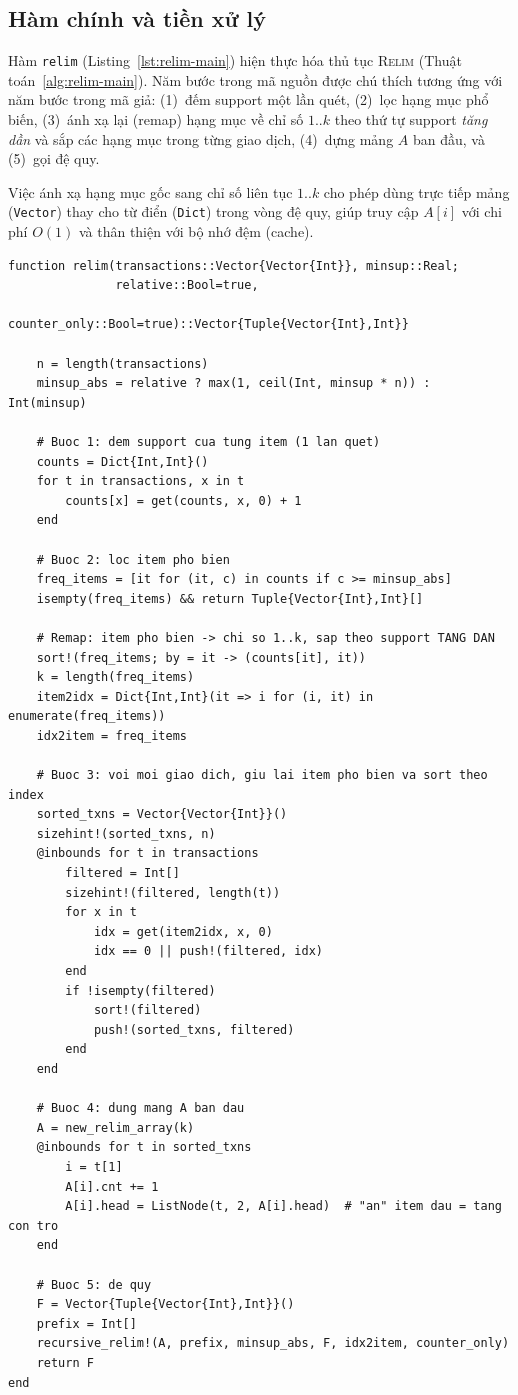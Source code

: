 \documentclass[12pt,a4paper]{report}
\begin{document}
\subsection{Hàm chính và tiền xử lý}

Hàm \texttt{relim} (Listing~\ref{lst:relim-main}) hiện thực hóa thủ tục
\textsc{Relim} (Thuật toán~\ref{alg:relim-main}). Năm bước trong mã nguồn được
chú thích tương ứng với năm bước trong mã giả: (1)~đếm support một lần quét,
(2)~lọc hạng mục phổ biến, (3)~ánh xạ lại (remap) hạng mục về chỉ số $1..k$ theo
thứ tự support \emph{tăng dần} và sắp các hạng mục trong từng giao dịch,
(4)~dựng mảng $A$ ban đầu, và (5)~gọi đệ quy.

Việc ánh xạ hạng mục gốc sang chỉ số liên tục $1..k$ cho phép dùng trực tiếp
mảng (\texttt{Vector}) thay cho từ điển (\texttt{Dict}) trong vòng đệ quy, giúp
truy cập $A[i]$ với chi phí $O(1)$ và thân thiện với bộ nhớ đệm (cache).

\begin{lstlisting}[style=julia, caption={Hàm chính \texttt{relim} (relim.jl)},
                   label={lst:relim-main}]
function relim(transactions::Vector{Vector{Int}}, minsup::Real;
               relative::Bool=true,
               counter_only::Bool=true)::Vector{Tuple{Vector{Int},Int}}

    n = length(transactions)
    minsup_abs = relative ? max(1, ceil(Int, minsup * n)) : Int(minsup)

    # Buoc 1: dem support cua tung item (1 lan quet)
    counts = Dict{Int,Int}()
    for t in transactions, x in t
        counts[x] = get(counts, x, 0) + 1
    end

    # Buoc 2: loc item pho bien
    freq_items = [it for (it, c) in counts if c >= minsup_abs]
    isempty(freq_items) && return Tuple{Vector{Int},Int}[]

    # Remap: item pho bien -> chi so 1..k, sap theo support TANG DAN
    sort!(freq_items; by = it -> (counts[it], it))
    k = length(freq_items)
    item2idx = Dict{Int,Int}(it => i for (i, it) in enumerate(freq_items))
    idx2item = freq_items

    # Buoc 3: voi moi giao dich, giu lai item pho bien va sort theo index
    sorted_txns = Vector{Vector{Int}}()
    sizehint!(sorted_txns, n)
    @inbounds for t in transactions
        filtered = Int[]
        sizehint!(filtered, length(t))
        for x in t
            idx = get(item2idx, x, 0)
            idx == 0 || push!(filtered, idx)
        end
        if !isempty(filtered)
            sort!(filtered)
            push!(sorted_txns, filtered)
        end
    end

    # Buoc 4: dung mang A ban dau
    A = new_relim_array(k)
    @inbounds for t in sorted_txns
        i = t[1]
        A[i].cnt += 1
        A[i].head = ListNode(t, 2, A[i].head)  # "an" item dau = tang con tro
    end

    # Buoc 5: de quy
    F = Vector{Tuple{Vector{Int},Int}}()
    prefix = Int[]
    recursive_relim!(A, prefix, minsup_abs, F, idx2item, counter_only)
    return F
end
\end{lstlisting}
\end{document}
